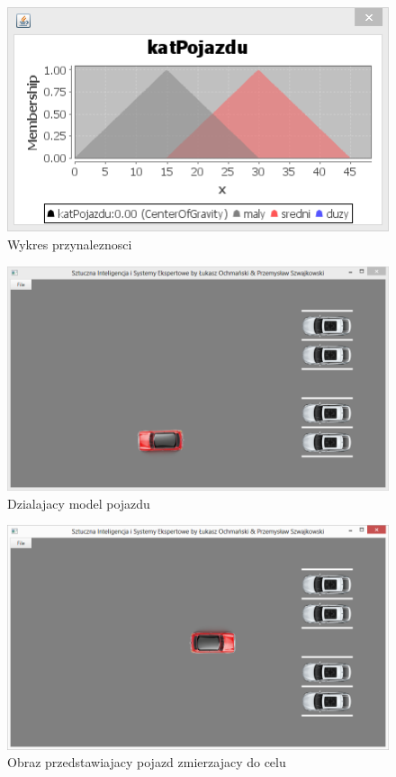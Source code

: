 \documentclass{classrep}
\begin{document}
\begin{figure}[ht]
\centering
			\includegraphics[scale=0.8]{pictures/Obraz09.png}
	\caption{Wykres przynaleznosci}
	\label{fig:Wykres przynaleznosci}
\end{figure}

\begin{figure}[ht]
\centering
			\includegraphics[scale=0.60]{pictures/Obraz10.png}
	\caption{Dzialajacy model pojazdu}
	\label{fig:Dzialajacy model pojazdu}
\end{figure}

\begin{figure}[ht]
\centering
			\includegraphics[scale=0.60]{pictures/Obraz11.png}
	\caption{Obraz przedstawiajacy pojazd zmierzajacy do celu}
	\label{fig:Obraz przedstawiajacy pojazd zmierzajacy do celu}
\end{figure}
\end{document}
